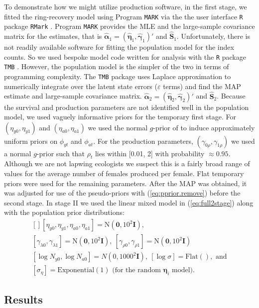\documentclass[12pt]{article}
\newcommand{\bn}{\boldsymbol{\eta}}
\newcommand{\bg}{\boldsymbol{\gamma}}
\newcommand{\ba}{\boldsymbol{\alpha}}
\newcommand{\bS}{\mathbf{S}}
\newcommand{\tN}{\text{N}}
\newcommand{\bI}{\mathbf{I}}
\begin{document}
To demonstrate how we might utilize production software, in the first stage, we fitted the ring-recovery model using Program {\tt MARK} \citep{white1999program} via the the user interface {\tt R} package {\tt RMark} \citep{laake2013:RMark}. Program {\tt MARK} provides the MLE and the large-sample covariance matrix for the estimates, that is $\hat{\ba}_1 = (\hat{\bn}_1, \hat{\bg}_1)'$ and $\hat{\bS}_1$. Unfortunately, there is not readily available software for fitting the population model for the index counts. So we used bespoke model code written for analysis with the {\tt R} package {\tt TMB} \citep{kristensen2016tmb}. However, the population model is the simpler of the two in terms of programming complexity. The {\tt TMB} package uses Laplace approximation to numerically integrate over the latent state errors ($\varepsilon$ terms) and find the MAP estimate and large-sample covariance matrix. $\hat{\ba}_2 = (\hat{\bn}_2, \hat{\bg}_2)'$ and $\hat{\bS}_2$. Because the survival and production parameters are not identified well in the population model, we used vaguely informative priors for the temporary first stage. For $(\eta_{y0},\eta_{y1})$ and $(\eta_{a0},\eta_{a1})$ we used the normal $g$-prior of \citet{hanson2014informative} to induce approximately uniform priors on $\phi_{yt}$ and $\phi_{at}$. For the production parameters, $(\gamma_{0\rho},\gamma_{1\rho})$ we used a normal $g$-prior such that $\rho_t$ lies within [0.01, 2] with probability $\approx 0.95$. Although we are not lapwing ecologists we suspect this is a fairly broad range of values for the average number of females produced per female. Flat temporary priors were used for the remaining parameters. After the MAP was obtained, it was adjusted for use of the pseudo-priors with (\ref{eq:pprior.remove}) before the second stage. In stage II we used the linear mixed model in (\ref{eq:full2stage}) along with the population prior distributions:
\[
\begin{gathered}[]
[\eta_{y0}, \eta_{y1}, \eta_{a0}, \eta_{a1}] = \tN(\mathbf{0}, 10^2\bI),\\
[\gamma_{\lambda 0}, \gamma_{\lambda 1}] = \tN(\mathbf{0}, 10^2\bI),\ [\gamma_{\rho 0}, \gamma_{\rho 1}] = \tN(\mathbf{0}, 10^2\bI) \\
[\log N_{y0}, \log N_{a0}] = N(0, 1000^2\bI),\ [\log\sigma] = \text{Flat}(), \text{ and}\\
[\sigma_\eta] = \text{Exponential}(1) \text{ (for the random $\bn_i$ model)}.
\end{gathered}
\] 

\subsection{Results} 
\end{document}
